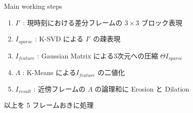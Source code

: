 \begin{frame}{Main working steps}
\begin{enumerate}
    \item $I'$ : 現時刻における差分フレームの $3\times3$ ブロック表現
    \item $I_{sparse}$ : K-SVD による $I'$ の疎表現
    \item $I_{feature}$ : Gaussian Matrix による3次元への圧縮 $\Theta I_{sparse}$
    \item $\Lambda$ : K-Means による$I_{feature}$ の二値化
    \item $I_{result}$ : 近傍フレームの $\Lambda$ の論理和に Erosion と Dilation
\end{enumerate}
以上を 5 フレームおきに処理
\end{frame}
